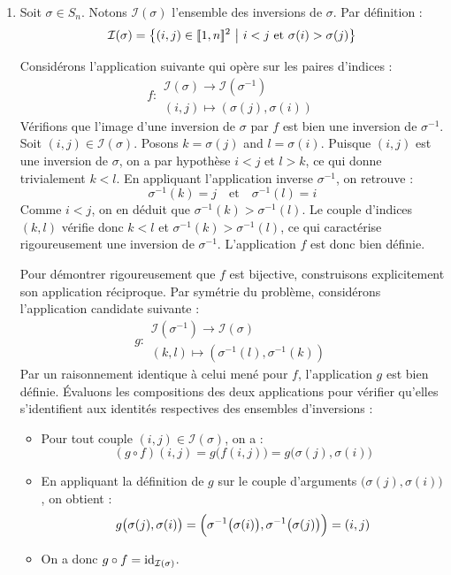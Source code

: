 \documentclass[12pt, a4paper]{report}
\begin{document}
\begin{enumerate}
    \item Soit $\sigma \in S_n$. Notons $\mathcal{I}(\sigma)$ l'ensemble des inversions de $\sigma$. Par définition :
    $$\mathcal{I}(\sigma) = \left\{ (i,j) \in [\![1,n]\!]^2 \ \middle| \ i < j \text{ et } \sigma(i) > \sigma(j) \right\}$$
    
    Considérons l'application suivante qui opère sur les paires d'indices :
    $$f : \begin{matrix} \mathcal{I}(\sigma) \to \mathcal{I}(\sigma^{-1}) \\ (i,j) \mapsto (\sigma(j), \sigma(i)) \end{matrix}$$
    Vérifions que l'image d'une inversion de $\sigma$ par $f$ est bien une inversion de $\sigma^{-1}$. Soit $(i,j) \in \mathcal{I}(\sigma)$. Posons $k = \sigma(j)$ and $l = \sigma(i)$. 
    Puisque $(i,j)$ est une inversion de $\sigma$, on a par hypothèse $i < j$ et $l > k$, ce qui donne trivialement $k < l$.
    En appliquant l'application inverse $\sigma^{-1}$, on retrouve :
    $$\sigma^{-1}(k) = j \quad \text{et} \quad \sigma^{-1}(l) = i$$
    Comme $i < j$, on en déduit que $\sigma^{-1}(k) > \sigma^{-1}(l)$. Le couple d'indices $(k,l)$ vérifie donc $k < l$ et $\sigma^{-1}(k) > \sigma^{-1}(l)$, ce qui caractérise rigoureusement une inversion de $\sigma^{-1}$. L'application $f$ est donc bien définie.
    
    Pour démontrer rigoureusement que $f$ est bijective, construisons explicitement son application réciproque. Par symétrie du problème, considérons l'application candidate suivante :
    $$g : \begin{matrix} \mathcal{I}(\sigma^{-1}) \to \mathcal{I}(\sigma) \\ (k,l) \mapsto (\sigma^{-1}(l), \sigma^{-1}(k)) \end{matrix}$$
    Par un raisonnement identique à celui mené pour $f$, l'application $g$ est bien définie. Évaluons les compositions des deux applications pour vérifier qu'elles s'identifient aux identités respectives des ensembles d'inversions :

    \begin{itemize}
        \item Pour tout couple $(i,j) \in \mathcal{I}(\sigma)$, on a :
        $$(g \circ f)(i,j) = g\bigl(f(i,j)\bigr) = g\bigl(\sigma(j), \sigma(i)\bigr)$$
        \item En appliquant la définition de $g$ sur le couple d'arguments $\bigl(\sigma(j), \sigma(i)\bigr)$, on obtient :
        $$g\bigl(\sigma(j), \sigma(i)\bigr) = \Bigl(\sigma^{-1}\bigl(\sigma(i)\bigr), \sigma^{-1}\bigl(\sigma(j)\bigr)\Bigr) = (i,j)$$
        \item On a donc $g \circ f = \mathrm{id}_{\mathcal{I}(\sigma)}$.


\end{itemize}
\end{enumerate}
\end{document}

